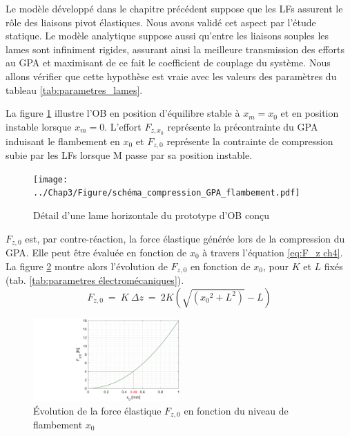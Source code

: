Le modèle développé dans le chapitre précédent suppose que les LFs assurent le rôle des liaisons pivot élastiques. Nous avons validé cet aspect par l'étude statique. Le modèle analytique suppose aussi qu'entre les liaisons souples les lames sont infiniment rigides, assurant ainsi la meilleure transmission des efforts au GPA et maximisant de ce fait le coefficient de couplage du système. Nous allons vérifier que cette hypothèse est vraie avec les valeurs des paramètres du tableau \ref{tab:parametres_lames}.

La figure \ref{fig:schema_compression_GPA_ch4} illustre l'OB en position d'équilibre stable à $x_m=x_0$ et en position instable lorsque $x_m=0$. L'effort $F_{z,x_0}$ représente la précontrainte du GPA induisant le flambement en $x_0$ et $F_{z,0}$ représente la contrainte de compression subie par les LFs lorsque M passe par sa position instable.
\begin{figure}[!htb]
	\begin{center}
		\captionsetup{justification=centering}
		\texttt{[image: ../Chap3/Figure/schéma\_compression\_GPA\_flambement.pdf]}
		\caption{Détail d'une lame horizontale du prototype d'OB conçu}
		\label{fig:schema_compression_GPA_ch4}
	\end{center}
\end{figure}  
$F_{z,0}$ est, par contre-réaction, la force élastique générée lors de la compression du GPA. Elle peut être évaluée en fonction de $x_0$ à travers l'équation \ref{eq:F_z ch4}. La figure \ref{fig:Fz(x0)} montre alors l'évolution de $F_{z,0}$ en fonction de $x_0$, pour $K$ et $L$ fixés (tab. \ref{tab:parametres électromécaniques}).
\begin{equation}
	F_{z,0}\ =\ K\ \Delta z\ =\  2K(\sqrt{({x_0}^2+L^2)}-L)
	\label{eq:F_z ch4}
\end{equation}
\begin{figure}[!htb]
\begin{center}
    \captionsetup{justification=centering}
	\includegraphics[trim={10cm 0cm 0cm 0cm},clip, 					                 width=0.5\textwidth]{../Chap3/Figure/Fz(x0).pdf}
	\caption{Évolution de la force élastique $F_{z,0}$ en fonction du niveau de flambement $x_0$}
	\label{fig:Fz(x0)}
\end{center}	
\end{figure}    
